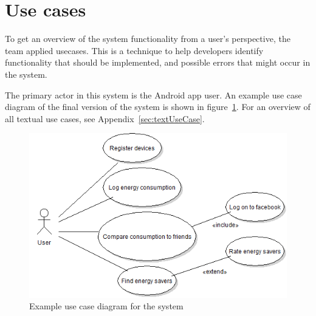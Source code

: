 \section{Use cases}
To get an overview of the system functionality from a user's perspective, the team applied \glspl{usecase}. This is a technique to help developers identify functionality that should be implemented, and possible errors that might occur in the system.

The primary actor in this system is the Android app user. An example use case diagram of the final version of the system is shown in figure~\ref{fig:usecase}. For an overview of all textual use cases, see Appendix~\ref{sec:textUseCase}.\\

\begin{figure}[H]
\includegraphics[width=\textwidth]{ch/specification/fig/currentUsecase.png}
\caption{Example use case diagram for the system}
\label{fig:usecase}
\end{figure}
